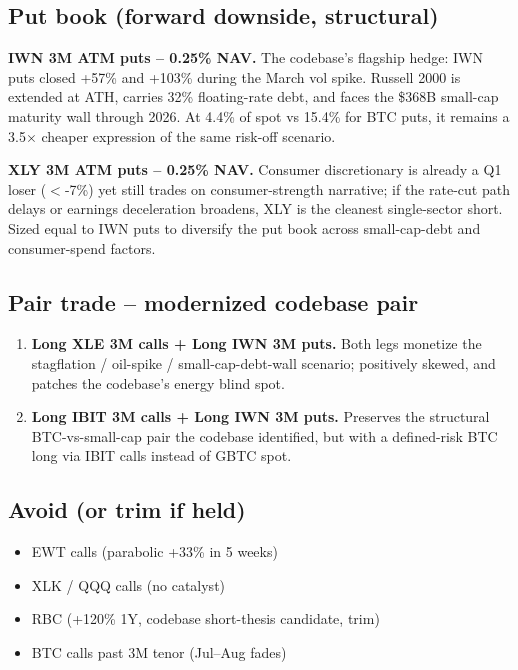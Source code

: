 \documentclass[11pt,letterpaper]{article}
\begin{document}
\subsection{Put book (forward downside, structural)}

\textbf{IWN 3M ATM puts -- 0.25\% NAV.} The codebase's flagship
hedge: IWN puts closed +57\% and +103\% during the March vol
spike. Russell 2000 is extended at ATH, carries 32\% floating-rate
debt, and faces the \$368B small-cap maturity wall through 2026.
At 4.4\% of spot vs 15.4\% for BTC puts, it remains a 3.5$\times$
cheaper expression of the same risk-off scenario.

\textbf{XLY 3M ATM puts -- 0.25\% NAV.} Consumer discretionary is
already a Q1 loser ($<$-7\%) yet still trades on consumer-strength
narrative; if the rate-cut path delays or earnings deceleration
broadens, XLY is the cleanest single-sector short. Sized equal to
IWN puts to diversify the put book across small-cap-debt and
consumer-spend factors.

\subsection{Pair trade -- modernized codebase pair}

\begin{enumerate}[nosep]
  \item \textbf{Long XLE 3M calls + Long IWN 3M puts.} Both legs
        monetize the stagflation / oil-spike / small-cap-debt-wall
        scenario; positively skewed, and patches the codebase's
        energy blind spot.
  \item \textbf{Long IBIT 3M calls + Long IWN 3M puts.} Preserves
        the structural BTC-vs-small-cap pair the codebase
        identified, but with a defined-risk BTC long via IBIT
        calls instead of GBTC spot.
\end{enumerate}

\subsection{Avoid (or trim if held)}
\begin{itemize}[nosep]
  \item EWT calls (parabolic +33\% in 5 weeks)
  \item XLK / QQQ calls (no catalyst)
  \item RBC (+120\% 1Y, codebase short-thesis candidate, trim)
  \item BTC calls past 3M tenor (Jul--Aug fades)
\end{itemize}
\end{document}
